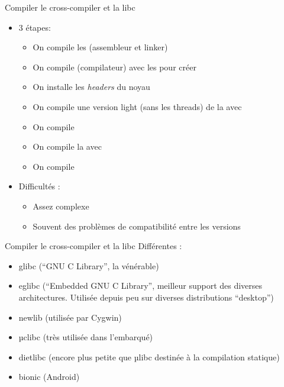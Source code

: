 \begin{frame}[fragile=singleslide]{Compiler le cross-compiler et la libc}
  \begin{itemize}
  \item 3 étapes:
    \begin{itemize}
    \item On compile les  (assembleur et linker)
    \item On compile  (compilateur) avec les 
      pour créer 
    \item On installe les \emph{headers} du noyau
    \item On compile une version light (sans les threads) de la  avec
    \item On compile 
    \item On compile la  avec 
    \item On compile 
    \end{itemize}
  \item Difficultés :
    \begin{itemize}
    \item Assez complexe
    \item Souvent des problèmes de compatibilité entre les versions
    \end{itemize}
  \end{itemize}
\end{frame}

\begin{frame}[fragile=singleslide]{Compiler le cross-compiler et la libc}
  Différentes :
  \begin{itemize}
  \item glibc (``GNU C Library'', la vénérable)
  \item  eglibc  (``Embedded GNU  C  Library'',  meilleur support  des
    diverses  architectures.  Utilisée  depuis peu  sur  diverses
    distributions ``desktop'')
  \item newlib (utilisée par Cygwin)
  \item µclibc (très utilisée dans l'embarqué)
  \item  dietlibc  (encore  plus   petite  que  µlibc  destinée  à  la
    compilation statique)
  \item bionic (Android)
  \end{itemize}
\end{frame}

